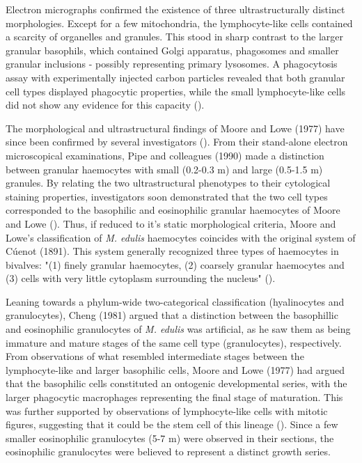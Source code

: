 Electron micrographs confirmed the existence of three ultrastructurally distinct morphologies. Except for a few mitochondria, the lymphocyte-like cells contained a scarcity of organelles and granules. This stood in sharp contrast to the larger granular basophils, which contained Golgi apparatus, phagosomes and smaller granular inclusions - possibly representing primary lysosomes. A phagocytosis assay with experimentally injected carbon particles revealed that both granular cell types displayed phagocytic properties, while the small lymphocyte-like cells did not show any evidence for this capacity (\cite{Moore1977}).

The morphological and ultrastructural findings of Moore and Lowe (1977) have since been confirmed by several investigators (\cite{Rasmussen1985, Renwartz1990, Pipe1990, Noel1994, Pipe1997, Wootton2003}). From their stand-alone electron microscopical examinations, Pipe and colleagues (1990) made a distinction between granular haemocytes with small (0.2-0.3 \micro m) and large (0.5-1.5 \micro m) granules. By relating the two ultrastructural phenotypes to their cytological staining properties, investigators soon demonstrated that the two cell types corresponded to the basophilic and eosinophilic granular haemocytes of Moore and Lowe (\cite{Pipe1990, Noel1994}). Thus, if reduced to it's static morphological criteria, Moore and Lowe's classification of \emph{M. edulis} haemocytes coincides with the original system of Cúenot (1891). This system generally recognized three types of haemocytes in bivalves: "(1) finely granular haemocytes, (2) coarsely granular haemocytes and (3) cells with very little cytoplasm surrounding the nucleus" (\cite{Cheng1984}). 

Leaning towards a phylum-wide two-categorical classification (hyalinocytes and granulocytes), Cheng (1981) argued that a distinction between the basophillic and eosinophilic granulocytes of \emph{M. edulis} was artificial, as he saw them as being immature and mature stages of the same cell type (granulocytes), respectively. From observations of what resembled intermediate stages between the lymphocyte-like and larger basophilic cells, Moore and Lowe (1977) had argued that the basophilic cells constituted an ontogenic developmental series, with the larger phagocytic macrophages representing the final stage of maturation. This was further supported by observations of lymphocyte-like cells with mitotic figures, suggesting that it could be the stem cell of this lineage (\cite{Moore1977}). Since a few smaller eosinophilic granulocytes (5-7 \micro m) were observed in their sections, the eosinophilic granulocytes were believed to represent a distinct growth series.

